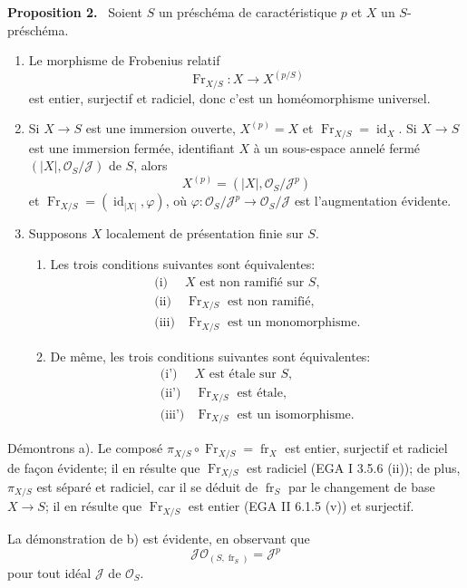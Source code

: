 \documentclass[11pt]{article}
\newenvironment{statement}[1]{\par\medskip\noindent\textbf{#1.}\ }{\par\medskip}
\providecommand{\OO}{\mathcal{O}}
\providecommand{\id}{\operatorname{id}}
\providecommand{\id}{\operatorname{id}}
\providecommand{\id}{\operatorname{id}}
\providecommand{\id}{\operatorname{id}}
\providecommand{\id}{\operatorname{id}}
\providecommand{\fr}{\operatorname{fr}}
\providecommand{\Fr}{\operatorname{Fr}}
\providecommand{\JJ}{\mathcal J}
\begin{document}
\begin{statement}{Proposition 2}
Soient $S$ un préschéma de caractéristique $p$ et $X$ un $S$-préschéma.
\begin{enumerate}[label=\alph*)]
\item Le morphisme de Frobenius relatif
\[
\Fr_{X/S}:X\longrightarrow X^{(p/S)}
\]
est entier, surjectif et radiciel, donc c'est un homéomorphisme universel.

\item Si $X\to S$ est une immersion ouverte, $X^{(p)}=X$ et $\Fr_{X/S}=\id_X$. Si $X\to S$ est une immersion fermée, identifiant $X$ à un sous-espace annelé fermé $(|X|,\OO_S/\JJ)$ de $S$, alors
\[
X^{(p)}=(|X|,\OO_S/\JJ^p)
\]
et $\Fr_{X/S}=(\id_{|X|},\varphi)$, où $\varphi:\OO_S/\JJ^p\to\OO_S/\JJ$ est l'augmentation évidente.

\item Supposons $X$ localement de présentation finie sur $S$.
\begin{enumerate}[label=\arabic*)]
\item Les trois conditions suivantes sont équivalentes:
\[
\begin{array}{ll}
\text{(i)}& X\text{ est non ramifié sur }S,\\
\text{(ii)}& \Fr_{X/S}\text{ est non ramifié},\\
\text{(iii)}& \Fr_{X/S}\text{ est un monomorphisme}.
\end{array}
\]
\item De même, les trois conditions suivantes sont équivalentes:
\[
\begin{array}{ll}
\text{(i')}& X\text{ est étale sur }S,\\
\text{(ii')}& \Fr_{X/S}\text{ est étale},\\
\text{(iii')}& \Fr_{X/S}\text{ est un isomorphisme}.
\end{array}
\]
\end{enumerate}
\end{enumerate}
\end{statement}

Démontrons a). Le composé $\pi_{X/S}\circ\Fr_{X/S}=\fr_X$ est entier, surjectif et radiciel de façon évidente; il en résulte que $\Fr_{X/S}$ est radiciel (EGA I 3.5.6 (ii)); de plus, $\pi_{X/S}$ est séparé et radiciel, car il se déduit de $\fr_S$ par le changement de base $X\to S$; il en résulte que $\Fr_{X/S}$ est entier (EGA II 6.1.5 (v)) et surjectif.

La démonstration de b) est évidente, en observant que
\[
\JJ\OO_{(S,\fr_S)}=\JJ^p
\]
pour tout idéal $\JJ$ de $\OO_S$.
\end{document}
